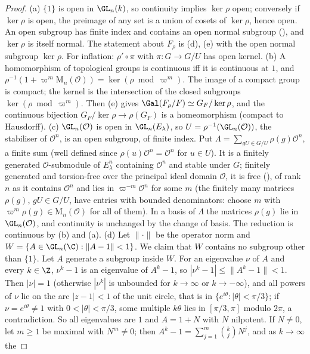 \begin{proof}
(a) $\{1\}$ is open in $\GL_n(k)$, so continuity implies $\ker\rho$ open; conversely if $\ker\rho$ is open, the preimage of any set is a union of cosets of
$\ker\rho$, hence open. An open subgroup has finite index and contains an open normal subgroup (), and $\ker\rho$ is itself normal. The statement
about $F_\rho$ is (d), (e) with the open normal subgroup $\ker\rho$. For inflation: $\rho'\circ\pi$ with $\pi\colon G\to G/U$ has open kernel.
(b) A homomorphism of topological groups is continuous iff it is continuous at $1$, and $\rho^{-1}(1+\varpi^m\mathrm{M}_n(\mathcal{O}))=\ker(\rho\bmod\varpi^m)$. The image
of a compact group is compact; the kernel is the intersection of the closed subgroups $\ker(\rho\bmod\varpi^m)$. Then (e) gives
$\Gal(F_\rho/F)\simeq G_F/\ker\rho$, and the continuous bijection $G_F/\ker\rho\to\rho(G_F)$ is a homeomorphism (compact to Hausdorff).
(c) $\GL_n(\mathcal{O})$ is open in $\GL_n(E_\lambda)$, so $U=\rho^{-1}(\GL_n(\mathcal{O}))$, the stabiliser of $\mathcal{O}^n$, is an open subgroup, of finite index. Put
$\Lambda=\sum_{gU\in G/U}\rho(g)\mathcal{O}^n$, a finite sum (well defined since $\rho(u)\mathcal{O}^n=\mathcal{O}^n$ for $u\in U$). It is a finitely generated
$\mathcal{O}$-submodule of $E_\lambda^n$ containing $\mathcal{O}^n$ and stable under $G$; finitely generated and torsion-free over the principal ideal domain $\mathcal{O}$, it is
free (), of rank $n$ as it contains $\mathcal{O}^n$ and lies in $\varpi^{-m}\mathcal{O}^n$ for some $m$ (the finitely many matrices $\rho(g)$, $gU\in G/U$, have entries with
bounded denominators: choose $m$ with $\varpi^m\rho(g)\in\mathrm{M}_n(\mathcal{O})$ for all of them). In a basis of $\Lambda$ the matrices $\rho(g)$ lie in
$\GL_n(\mathcal{O})$, and continuity is unchanged by the change of basis. The reduction is continuous by (b) and (a).
(d) Let $\|\cdot\|$ be the operator norm and $W=\{A\in\GL_n(\C):\|A-1\|<1\}$. We claim that $W$ contains no subgroup other than $\{1\}$. Let $A$ generate a subgroup
inside $W$. For an eigenvalue $\nu$ of $A$ and every $k\in\Z$, $\nu^k-1$ is an eigenvalue of $A^k-1$, so $|\nu^k-1|\le\|A^k-1\|<1$. Then $|\nu|=1$
(otherwise $|\nu^k|$ is unbounded for $k\to\infty$ or $k\to-\infty$), and all powers of $\nu$ lie on the arc $|z-1|<1$ of the unit circle, that is in
$\{e^{i\theta}:|\theta|<\pi/3\}$; if $\nu=e^{i\theta}\ne1$ with $0<|\theta|<\pi/3$, some multiple $k\theta$ lies in $[\pi/3,\pi]$ modulo $2\pi$, a contradiction. So
all eigenvalues are $1$ and $A=1+N$ with $N$ nilpotent. If $N\ne0$, let $m\ge1$ be maximal with $N^m\ne0$; then $A^k-1=\sum_{j=1}^m\binom kjN^j$, and as $k\to\infty$ the

\end{proof}
